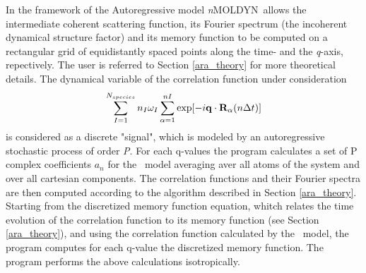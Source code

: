 \documentclass[a4paper,11pt]{report}
\newcommand{\qval}{\textit{q}}
\newcommand{\NMOLDYN}{\textit{n}MOLDYN}
\begin{document}
In the framework of the Autoregressive model \NMOLDYN\ allows the intermediate coherent scattering function, its Fourier spectrum 
(the incoherent dynamical structure factor) and its memory function to be computed on a rectangular grid of equidistantly 
spaced points along the time- and the \qval-axis, repectively. The user is referred to Section \ref{ara_theory} for more theoretical 
details. The dynamical variable of the correlation function under consideration
\begin{equation}
\sum_{I=1}^{N_{species}} n_I \omega_I \sum^{nI}_{\alpha=1} \exp[-i{\bf q}\cdot{\bf R}_\alpha(n\Delta t)]
\end{equation}
is considered as a discrete "signal", which 
is modeled by an autoregressive stochastic process of order \textit{P}. For each q-values the program calculates a set of P complex 
coefficients ${a_n}$ for the \AR\ model averaging aver all atoms of the system and over all cartesian components. The 
correlation functions and their Fourier spectra are then computed according to the algorithm described in 
Section \ref{ara_theory}. Starting from the discretized memory function equation, whitch relates the time 
evolution of the correlation function to its memory function (see Section \ref{ara_theory}), and using the correlation function calculated by the \AR\ model, the program computes for each q-value the discretized memory function.
The program performs the above calculations isotropically.
\end{document}
